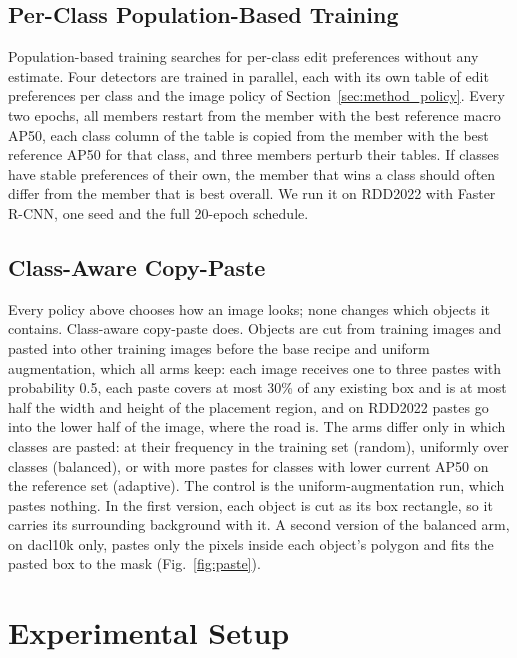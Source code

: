 \documentclass[conference]{IEEEtran}
\begin{document}
\subsection{Per-Class Population-Based Training}
\label{sec:method_pbt}

Population-based training searches for per-class edit preferences without any estimate. Four detectors are trained in parallel, each with its own table of edit preferences per class and the image policy of Section~\ref{sec:method_policy}. Every two epochs, all members restart from the member with the best reference macro AP50, each class column of the table is copied from the member with the best reference AP50 for that class, and three members perturb their tables. If classes have stable preferences of their own, the member that wins a class should often differ from the member that is best overall. We run it on RDD2022 with Faster R-CNN, one seed and the full 20-epoch schedule.

\subsection{Class-Aware Copy-Paste}
\label{sec:method_paste}

Every policy above chooses how an image looks; none changes which objects it contains. Class-aware copy-paste does. Objects are cut from training images and pasted into other training images before the base recipe and uniform augmentation, which all arms keep: each image receives one to three pastes with probability 0.5, each paste covers at most 30\% of any existing box and is at most half the width and height of the placement region, and on RDD2022 pastes go into the lower half of the image, where the road is. The arms differ only in which classes are pasted: at their frequency in the training set (random), uniformly over classes (balanced), or with more pastes for classes with lower current AP50 on the reference set (adaptive). The control is the uniform-augmentation run, which pastes nothing. In the first version, each object is cut as its box rectangle, so it carries its surrounding background with it. A second version of the balanced arm, on dacl10k only, pastes only the pixels inside each object's polygon and fits the pasted box to the mask (Fig.~\ref{fig:paste}).


\section{Experimental Setup}
\label{sec:setup}
\end{document}
